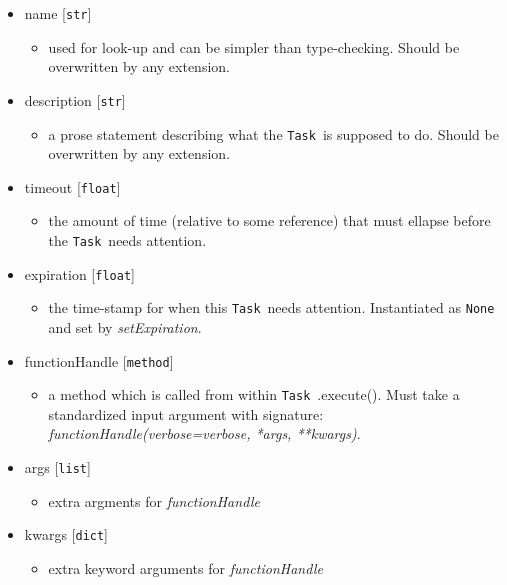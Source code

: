 \documentclass{article}
\newcommand{\Task}{\texttt{Task}~}
\begin{document}
\begin{itemize}
    \item{name [\texttt{str}]
        \begin{itemize}
            \item{used for look-up and can be simpler than type-checking. Should be overwritten by any extension.}
        \end{itemize}
         }
    \item{description [\texttt{str}]
        \begin{itemize}
            \item{a prose statement describing what the \Task is supposed to do. Should be overwritten by any extension.}
        \end{itemize}
         }
    \item{timeout [\texttt{float}]
        \begin{itemize}
            \item{the amount of time (relative to some reference) that must ellapse before the \Task needs attention.}
        \end{itemize}
         }
    \item{expiration [\texttt{float}]
        \begin{itemize}
            \item{the time-stamp for when this \Task needs attention. Instantiated as \texttt{None} and set by \textit{setExpiration}.}
        \end{itemize}
         }
    \item{functionHandle [\texttt{method}]
        \begin{itemize}
            \item{a method which is called from within \Task.execute(). Must take a standardized input argument with signature: \textit{functionHandle(verbose=verbose, *args, **kwargs)}.}
        \end{itemize}
         }
    \item{args [\texttt{list}]
        \begin{itemize}
            \item{extra argments for \textit{functionHandle}}
        \end{itemize}
         }
    \item{kwargs [\texttt{dict}]
        \begin{itemize}
            \item{extra keyword arguments for \textit{functionHandle}}
        \end{itemize}
         }
\end{itemize}
\end{document}
